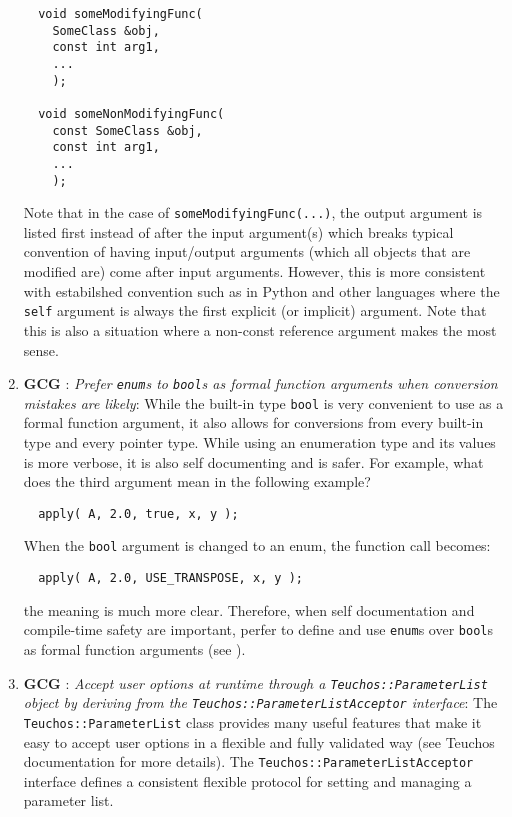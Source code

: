 \begin{enumerate}
{\small\begin{verbatim}
  void someModifyingFunc(
    SomeClass &obj,
    const int arg1,
    ...
    );

  void someNonModifyingFunc(
    const SomeClass &obj,
    const int arg1,
    ...
    );
\end{verbatim}}

Note that in the case of {}\texttt{someModifyingFunc(...)}, the output
argument is listed first instead of after the input argument(s) which breaks
typical convention of having input/output arguments (which all objects that
are modified are) come after input arguments.  However, this is more
consistent with estabilshed convention such as in Python and other languages
where the {}\texttt{self} argument is always the first explicit (or implicit)
argument.  Note that this is also a situation where a non-const reference
argument makes the most sense.

{}\item{}\textbf{GCG }:
{}\textit{Prefer {}\texttt{enum}s to {}\texttt{bool}s as formal function
arguments when conversion mistakes are likely}: While the built-in type
{}\texttt{bool} is very convenient to use as a formal function argument, it
also allows for conversions from every built-in type and every pointer type.
While using an enumeration type and its values is more verbose, it is also
self documenting and is safer.  For example, what does the third argument mean
in the following example?

{\small\begin{verbatim}
  apply( A, 2.0, true, x, y );
\end{verbatim}}

When the {}\texttt{bool} argument is changed to an enum, the function call
becomes:

{\small\begin{verbatim}
  apply( A, 2.0, USE_TRANSPOSE, x, y );
\end{verbatim}}

the meaning is much more clear.  Therefore, when self documentation and
compile-time safety are important, perfer to define and use {}\texttt{enum}s
over {}\texttt{bool}s as formal function arguments (see {}\cite[Section
12.6]{CodeComplete2nd04}).

{}\item{}\textbf{GCG }:
{}\textit{Accept user options at runtime through a
{}\texttt{Teuchos\-::Parameter\-List} object by deriving from the
{}\texttt{Teuchos\-::Parameter\-List\-Acceptor} interface}: The
{}\texttt{Teuchos\-::Parameter\-List} class provides many useful features that
make it easy to accept user options in a flexible and fully validated way (see
Teuchos documentation for more details).  The
{}\texttt{Teuchos\-::Parameter\-List\-Acceptor} interface defines a consistent
flexible protocol for setting and managing a parameter list.


\end{enumerate}
